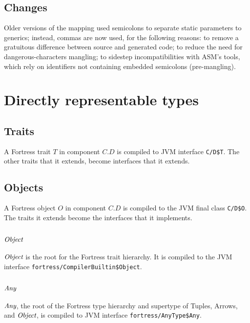 \documentclass[11pt]{article}
\newcommand{\fit}[1]{\mbox{\it #1}}
\newcommand{\jvm}[1]{{\tt #1}}
\begin{document}
\subsection{Changes}
Older versions of the mapping used semicolons to separate static parameters to generics; instead, commas are now used, for the following reasons: to remove a gratuitous difference between source and generated code; to reduce the need for dangerous-characters mangling; to sidestep incompatibilities with ASM's tools, which rely on identifiers not containing embedded semicolons (pre-mangling).

\section{Directly representable types}
\subsection{Traits}
A Fortress trait $T$ in component $C.D$ is compiled to JVM interface \jvm{C/D\$T}.  The other traits that it extends, become interfaces that it extends.

\subsection{Objects}
A Fortress object $O$ in component $C.D$ is compiled to the JVM final class \jvm{C/D\$O}.
The traits it extends become the interfaces that it implements.

\subsection{$\fit{Object}$}
$\fit{Object}$ is the root for the Fortress trait hierarchy.  It is compiled to the JVM interface \jvm{fortress/CompilerBuiltin\$Object}.

\subsection{$\fit{Any}$}
$\fit{Any}$, the root of the Fortress type hierarchy and supertype of Tuples, Arrows, and $\fit{Object}$,
is compiled to JVM interface \jvm{fortress/AnyType\$Any}.
\end{document}
